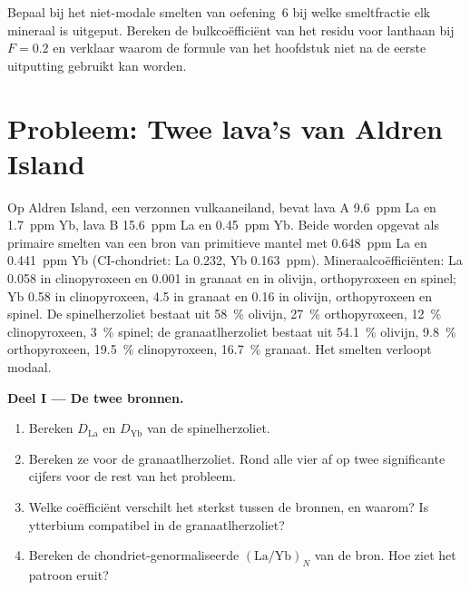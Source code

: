 \begin{exercise}[$\star\star\star$]\label{exo:b3:trace-element-modelling:12}
Bepaal bij het niet-modale smelten van oefening~6 bij welke smeltfractie elk
mineraal is uitgeput. Bereken de bulkcoëfficiënt van het residu voor lanthaan bij
$F = 0.2$ en verklaar waarom de formule van het hoofdstuk niet na de
eerste uitputting gebruikt kan worden.
\end{exercise}

\section{Probleem: Twee lava's van Aldren Island}

\begin{problem}\label{pb:b3:trace-element-modelling:1}
Op Aldren Island, een verzonnen vulkaaneiland, bevat lava A \qty{9.6}{ppm} La
en \qty{1.7}{ppm} Yb, lava B \qty{15.6}{ppm} La en \qty{0.45}{ppm} Yb.
Beide worden opgevat als primaire smelten van een bron van primitieve mantel met
\qty{0.648}{ppm} La en \qty{0.441}{ppm} Yb (CI-chondriet: La 0.232, Yb
\qty{0.163}{ppm}). Mineraalcoëfficiënten: La 0.058 in clinopyroxeen en 0.001
in granaat en in olivijn, orthopyroxeen en spinel; Yb 0.58 in
clinopyroxeen, 4.5 in granaat en 0.16 in olivijn, orthopyroxeen en spinel.
De spinelherzoliet bestaat uit \qty{58}{\percent} olivijn, \qty{27}{\percent} orthopyroxeen, \qty{12}{\percent}
clinopyroxeen, \qty{3}{\percent} spinel; de granaatlherzoliet bestaat uit \qty{54.1}{\percent} olivijn, \qty{9.8}{\percent}
orthopyroxeen, \qty{19.5}{\percent} clinopyroxeen, \qty{16.7}{\percent} granaat. Het smelten verloopt modaal.

\medskip\noindent\textbf{Deel I --- De twee bronnen.}
\begin{enumerate}
\item Bereken $D_{\mathrm{La}}$ en $D_{\mathrm{Yb}}$ van de spinelherzoliet.
\item Bereken ze voor de granaatlherzoliet. Rond alle vier af op twee significante
cijfers voor de rest van het probleem.
\item Welke coëfficiënt verschilt het sterkst tussen de bronnen, en waarom? Is
ytterbium compatibel in de granaatlherzoliet?
\item Bereken de chondriet-genormaliseerde $(\mathrm{La}/\mathrm{Yb})_N$ van de
bron. Hoe ziet het patroon eruit?
\end{enumerate}


\end{problem}
